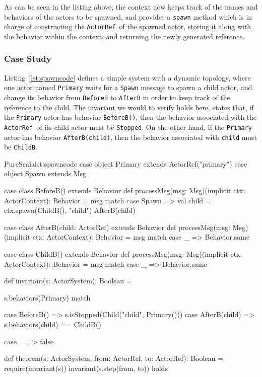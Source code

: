 \documentclass[a4paper,twoside]{article}
\newcommand{\InlineS}[1]{\lstinline[language=PureScala,basicstyle=\small\ttfamily,columns=fixed]|#1|}
\newcommand{\RefCode}[1]{Listing~\ref{#1}}
\newcommand{\ActorRef}{\InlineS{ActorRef}\ }
\newcommand{\stt}[1]{\texttt{\small{#1}}}
\begin{document}
As can be seen in the listing above, the context now keeps track of the names and 
behaviors of the actors to be spawned, and provides a \stt{spawn} method which is in  charge of constructing the \ActorRef of the spawned actor, storing it along with the  behavior within the context, and returning the newly generated reference.

\subsubsection{Case Study}

\RefCode{lst:spawncode} defines a simple system with a dynamic topology, where one actor named \stt{Primary} waits for a \stt{Spawn} message to spawn a child actor, and change its behavior from \stt{BeforeB} to \stt{AfterB} in order to keep track of the reference to the child. The invariant we would to verify holds here, states that, if the \stt{Primary} actor has behavior \stt{BeforeB()}, then the behavior associated with the \ActorRef of its child actor must be \stt{Stopped}. On the other hand, if the \stt{Primary} actor has behavior \stt{AfterB(child)}, then the behavior associated with \stt{child} must be \stt{ChildB}.

\begin{Code}{PureScala}{lst:spawncode}{}
case object Primary extends ActorRef("primary")
case object Spawn extends Msg

case class BeforeB() extends Behavior {
  def processMsg(msg: Msg)(implicit ctx: ActorContext): Behavior = msg match {
    case Spawn =>
      val child = ctx.spawn(ChildB(), "child")
      AfterB(child)
  }
}

case class AfterB(child: ActorRef) extends Behavior {
  def processMsg(msg: Msg)(implicit ctx: ActorContext): Behavior = msg match {
    case _ => Behavior.same
  }
}

case class ChildB() extends Behavior {
  def processMsg(msg: Msg)(implicit ctx: ActorContext): Behavior = msg match {
    case _ => Behavior.same
  }
}

def invariant(s: ActorSystem): Boolean = {
  s.behaviors(Primary) match {
    case BeforeB() =>
      s.isStopped(Child("child", Primary()))
    case AfterB(child) =>
      s.behaviors(child) == ChildB()

    case _ => false
  }
}

def theorem(s: ActorSystem, from: ActorRef, to: ActorRef): Boolean = {
  require(invariant(s))
  invariant(s.step(from, to))
} holds
\end{Code}
\end{document}

